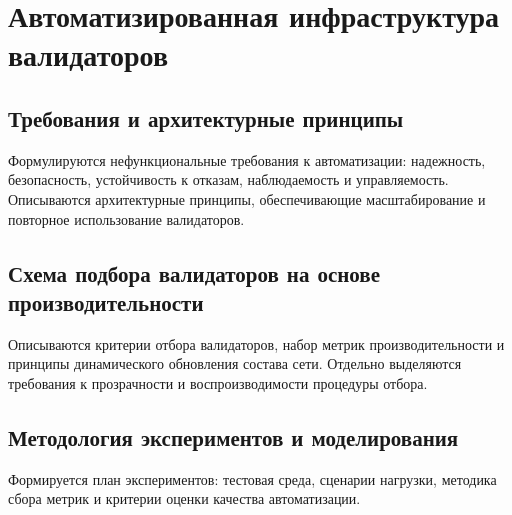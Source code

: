 \chapter{Автоматизированная инфраструктура валидаторов}\label{ch:ch4}

\section{Требования и архитектурные принципы}\label{sec:ch4/sec1}

Формулируются нефункциональные требования к автоматизации: надежность, безопасность,
устойчивость к отказам, наблюдаемость и управляемость. Описываются архитектурные
принципы, обеспечивающие масштабирование и повторное использование валидаторов.

\section{Схема подбора валидаторов на основе производительности}\label{sec:ch4/sec2}

Описываются критерии отбора валидаторов, набор метрик производительности и
принципы динамического обновления состава сети. Отдельно выделяются требования к
прозрачности и воспроизводимости процедуры отбора.

\section{Методология экспериментов и моделирования}\label{sec:ch4/sec3}

Формируется план экспериментов: тестовая среда, сценарии нагрузки, методика
сбора метрик и критерии оценки качества автоматизации.
